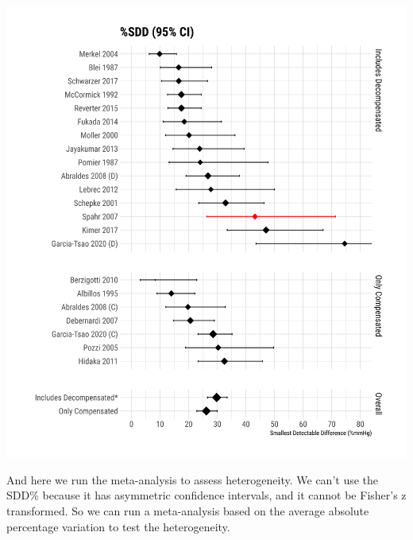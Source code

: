 \documentclass[
]{article}
\begin{document}
\includegraphics{figures/sdd_perc_forest-1.png}

And here we run the meta-analysis to assess heterogeneity. We can't use
the SDD\% because it has asymmetric confidence intervals, and it cannot
be Fisher's z transformed. So we can run a meta-analysis based on the
average absolute percentage variation to test the heterogeneity.
\end{document}
